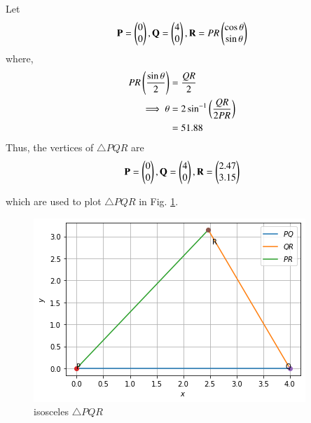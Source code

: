 Let
\begin{align}
\mathbf{P} = \begin{pmatrix}0\\0\end{pmatrix}, \mathbf{Q} = \begin{pmatrix}4\\0\end{pmatrix}, \mathbf{R} = PR\begin{pmatrix}\cos \theta\\  \sin \theta\end{pmatrix}
\end{align}
where,
\begin{align}
    PR\left(\frac{\sin\theta}{2}\right)&=\frac{QR}{2}
    \\
    \implies \theta &=2\sin^{-1}\left(\frac{QR}{2PR}\right)
\\
  &=51.88
\end{align}
Thus, the vertices of $\triangle PQR$ are
\begin{align}
\mathbf{P} = \begin{pmatrix}0\\0\end{pmatrix}, \mathbf{Q} = \begin{pmatrix}4\\0\end{pmatrix}, \mathbf{R} = \begin{pmatrix}2.47\\3.15\end{pmatrix}
\end{align}


which are used to plot  $\triangle PQR$  in Fig. \ref{constr/tri/12fig:isosceles_triangle}.	
%
\begin{figure}[!ht]
\centering
\includegraphics[width=\columnwidth]{solutions/triangle/12/fig.png}
\caption{isosceles $\triangle PQR$}
\label{constr/tri/12fig:isosceles_triangle}	
\end{figure}

